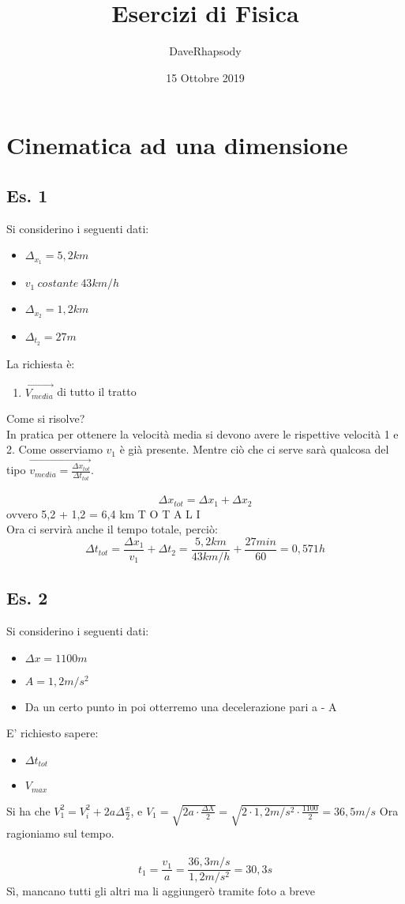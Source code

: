 \documentclass[12pt, a4paper, openany, twoside]{book}
\begin{document}
\selectfont
\author{DaveRhapsody}
\title {Esercizi di Fisica}
\date {15 Ottobre 2019}
\maketitle
\tableofcontents
\chapter{Cinematica ad una dimensione}
\section{Es. 1}
Si considerino i seguenti dati:
\begin{itemize}
	\item $\Delta_{x_{1}} = 5,2km$
	\item $v_{1} ~ costante ~ 43km/h$
	\item $\Delta_{x_{2}} = 1,2km$
	\item $\Delta_{t_{2}} = 27m$
\end{itemize}
La richiesta è:
\begin{enumerate}
	\item $\overrightarrow{V_{media}}$ di tutto il tratto 
\end{enumerate}
Come si risolve? \\
In pratica per ottenere la velocità media si devono avere le rispettive velocità
1 e 2. Come osserviamo $v_{1}$ è già presente. Mentre ciò che ci serve sarà 
qualcosa del tipo $\overrightarrow{v_{media} = \frac{\Delta x_{tot}}{\Delta t_{tot}}}$.
\\ \\
$$\Delta x_{tot} = \Delta x_{1} + \Delta x_{2}$$
ovvero 5,2 + 1,2 = 6,4 km T O T A L I \\
Ora ci servirà anche il tempo totale, perciò:
$$\Delta t_{tot} = \frac{\Delta x_{1}}{v_{1}} + \Delta t_{2} = \frac{5,2 km}
{43 km/h} + \frac{27 min}{60} = 0,571 h$$
\section{Es. 2}
Si considerino i seguenti dati:
\begin{itemize}
	\item $\Delta x = 1100m$
	\item $A = 1,2m/s^{2}$
	\item Da un certo punto in poi otterremo una decelerazione pari a - A
\end{itemize}
E' richiesto sapere:
\begin{itemize}
	\item $\Delta t_{tot}$
	\item $V_{max}$
\end{itemize}
Si ha che $V_{1}^{2} = V_{i}^{2} + 2a \Delta \frac{x}{2}$, e 
$V_{1} = \sqrt{2a \cdot \frac{\Delta X}{2}} = \sqrt{2\cdot1,2m/s^{2}\cdot \frac{1100}{2}} = 36,5 m/s$
Ora ragioniamo sul tempo. \\ \\
$$t_{1} = \frac{v_{1}}{a} = \frac{36,3 m/s}{1,2 m/s^{2}} = 30,3s$$
Sì, mancano tutti gli altri ma li aggiungerò tramite foto a breve
\end{document}
